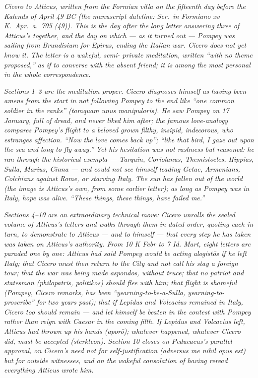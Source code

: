 
\textit{Cicero to Atticus, written from the Formian villa
on the fifteenth day before the Kalends of April 49 BC
(the manuscript dateline: \textit{Scr.\ in Formiano xv K.\
Apr.\ a.\ 705 (49)}). This is the day after the long
letter answering three of Atticus's together, and the day
on which --- as it turned out --- Pompey was sailing from
Brundisium for Epirus, ending the Italian war. Cicero
does not yet know it. The letter is a wakeful, semi-
private meditation, written ``with no theme proposed,'' as
if to converse with the absent friend; it is among the
most personal in the whole correspondence.}

\textit{Sections 1--3 are the meditation proper. Cicero
diagnoses himself as having been \textit{amens} from the
start in not following Pompey to the end like ``one common
soldier in the ranks'' (\textit{tamquam unus manipularis}).
He saw Pompey on 17 January, full of dread, and never
liked him after; the famous love-analogy compares
Pompey's flight to a beloved grown filthy, insipid,
indecorous, who estranges affection. ``Now the love comes
back up''; ``like that bird, I gaze out upon the sea and
long to fly away.'' Yet his hesitation was not rashness
but reasoned: he ran through the historical exempla ---
Tarquin, Coriolanus, Themistocles, Hippias, Sulla, Marius,
Cinna --- and could not see himself leading Getae,
Armenians, Colchians against Rome, or starving Italy. The
sun has fallen out of the world (the image is Atticus's
own, from some earlier letter); as long as Pompey was in
Italy, hope was alive. ``These things, these things, have
failed me.''}

\textit{Sections 4--10 are an extraordinary technical
move: Cicero unrolls the sealed volume of Atticus's
letters and walks through them in dated order, quoting
each in turn, to demonstrate to Atticus --- and to
himself --- that every step he has taken was taken on
Atticus's authority. From 10 K Febr to 7 Id. Mart, eight
letters are paraded one by one: Atticus had said Pompey
would be acting \textit{alogist\=os} if he left Italy;
that Cicero must then return to the City and not call
his stay a foreign tour; that the war was being made
\textit{aspondos}, without truce; that no patriot and
statesman (\textit{philopatris}, \textit{politikos}) should
flee with him; that flight is shameful (Pompey, Cicero
remarks, has been ``yearning-to-be-a-Sulla, yearning-to-
proscribe'' for two years past); that if Lepidus and
Volcacius remained in Italy, Cicero too should remain ---
and let himself be beaten in the contest with Pompey
rather than reign with Caesar in the coming filth. If
Lepidus and Volcacius left, Atticus had thrown up his
hands (\textit{apor\=o}); whatever happened, whatever
Cicero did, must be accepted (\textit{sterkteon}). Section
10 closes on Peducaeus's parallel approval, on Cicero's
need not for self-justification (\textit{adversus me nihil
opus est}) but for outside witnesses, and on the wakeful
consolation of having reread everything Atticus wrote
him.}
